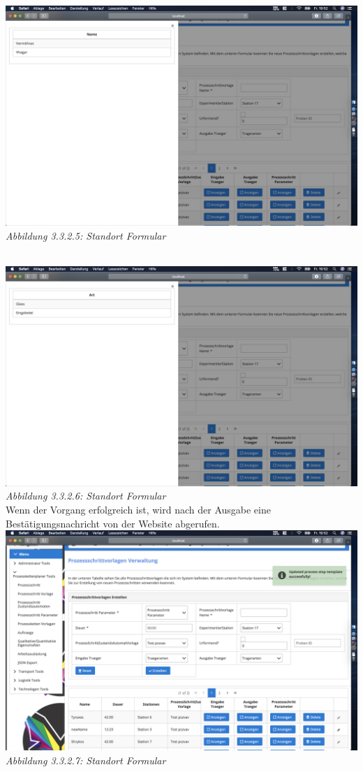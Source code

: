 \documentclass[enabledeprecatedfontcommands,fontsize=12pt,paper=a4,twoside]{scrartcl}
\begin{document}
\hypertarget{sc3.3.2.5}{
\includegraphics[width=1\textwidth]{Screenshots/332log2psv.png}
\textit{Abbildung 3.3.2.5: Standort Formular}
} \\

\hypertarget{sc3.3.2.6}{
\includegraphics[width=1\textwidth]{Screenshots/332logpsv.png}
\textit{Abbildung 3.3.2.6: Standort Formular}
} \\

Wenn der Vorgang erfolgreich ist, wird nach der Ausgabe eine Bestätigungsnachricht von der Website abgerufen.\\

\hypertarget{sc3.3.2.7}{
\includegraphics[width=1\textwidth]{Screenshots/332updatepsv.png}\\
\textit{Abbildung 3.3.2.7: Standort Formular}
} \\
\end{document}
